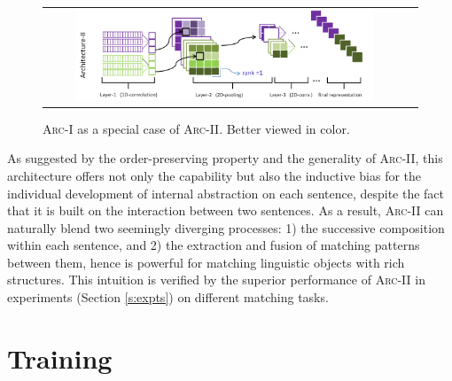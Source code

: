 \documentclass{article} %
\begin{document}
\begin{figure}[h!]
\begin{center}
    \begin{tabular}[c]{cc}
      \includegraphics[width=0.85\textwidth]{pics/subsume.png}
      \hspace{160pt}
\end{tabular}
\vspace{-10pt}
    \caption{\textsc{Arc-I} as a special case of \textsc{Arc-II}. Better viewed in color.}
    \label{f:specialcase}
  \end{center}
\end{figure}
\newpage
As suggested by the order-preserving property and the generality of \textsc{Arc-II}, this architecture offers not only the capability but also the inductive bias for the individual development of internal abstraction on each sentence, despite the fact that it is built on the interaction between two sentences. As a result, \textsc{Arc-II} can naturally blend two seemingly diverging processes: 1) the successive composition within each sentence, and 2) the extraction and fusion of matching patterns between them, hence is powerful for matching linguistic objects with rich structures. This intuition is verified by the superior performance of \textsc{Arc-II} in experiments (Section \ref{s:expts}) on different matching tasks.

\section{Training}  \label{s:opt} \vspace{-10pt}
\end{document}
